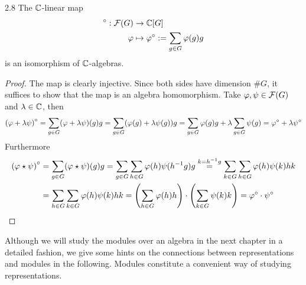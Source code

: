 \documentclass[twoside = false,	%
		headsepline,		%
		parskip = true,
		]{scrbook}						%
\begin{document}
        \begin{proposition}{}{2.8}
            The $\mathbb C$-linear map
            \begin{equation*}
            \begin{split}
                {}^\circ : \mathcal F(G) &\to \mathbb C[G] \\
                \varphi &\mapsto \varphi^\circ:= \sum_{g \in G}\varphi(g)g
            \end{split}
            \end{equation*}
            is an isomorphism of $\mathbb C$-algebras.
        \end{proposition}
        \begin{proof}
            The map is clearly injective. Since both sides have dimension $\#G$, it suffices to show that the map is an algebra homomorphism.
            Take $\varphi,\psi \in \mathcal F(G)$ and $\lambda \in \mathbb C$, then
            \begin{equation*}
            \begin{split}
                \left( \varphi + \lambda \psi\right)^\circ = \sum_{g \in G} (\varphi + \lambda \psi)(g)g = \sum_{g \in G} (\varphi(g) + \lambda \psi(g))g = \sum_{g \in G} \varphi(g)g + \lambda \sum_{g \in G} \psi(g) =\varphi^\circ + \lambda \psi^\circ
            \end{split}
            \end{equation*}
            Furthermore
            \begin{equation*}
            \begin{split}
                \left( \varphi \star \psi\right)^\circ &= \sum_{g \in G}(\varphi \star \psi)(g)g = \sum_{g \in G} \sum_{h \in G} \varphi(h) \psi(h^{-1}g)g \overset{k = h^{-1}g}{=} \sum_{k \in G} \sum_{h \in G} \varphi(h) \psi(k) hk \\
                &= \sum_{h \in G}\sum_{k \in G} \varphi(h) \psi(k) hk = \left( \sum_{h \in G} \varphi(h)h\right) \cdot \left( \sum_{k \in G} \psi(k)k\right) = \varphi^\circ \cdot \psi^\circ 
            \end{split}
            \end{equation*}
        \end{proof}
        Although we will study the modules over an algebra in the next chapter in a detailed fashion, we give some hints on the connections between representations and modules in the following. Modules constitute a convenient way of studying representations.
\end{document}
